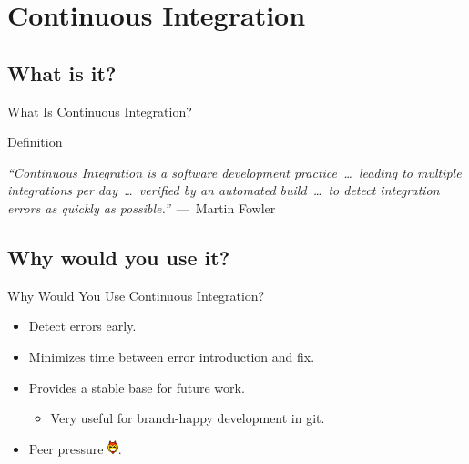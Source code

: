 \documentclass[xcolor=dvipsnames]{beamer}
\begin{document}
  \section{Continuous Integration}
    \subsection{What is it?}
      \begin{frame}{What Is Continuous Integration?}
        \begin{center}\begin{minipage}{0.8\linewidth}\begin{block}{Definition\footnotemark[2]}

              \emph{``Continuous Integration is a software development
              practice~\dots\ leading to multiple integrations per day~\dots\
              verified by an automated build~\dots\ to detect integration errors
              as quickly as possible.''}~---~Martin Fowler

        \end{block}\end{minipage}\end{center}

      \end{frame}

    \subsection{Why would you use it?}
      \begin{frame}{Why Would You Use Continuous Integration?}
        \Large
        \begin{itemize}
          \pause\item Detect errors early.
          \vspace{\baselineskip}
          \pause\item Minimizes time between error introduction and fix.
          \vspace{\baselineskip}
          \pause\item Provides a stable base for future work.
          \begin{itemize}
            \pause \item \large Very useful for branch-happy development in git.
          \end{itemize}
          \vspace{0.5\baselineskip}
          \pause\item Peer pressure
                \includegraphics[height=11pt]{images/smiley-devil}.
        \end{itemize}
      \end{frame}
\end{document}
